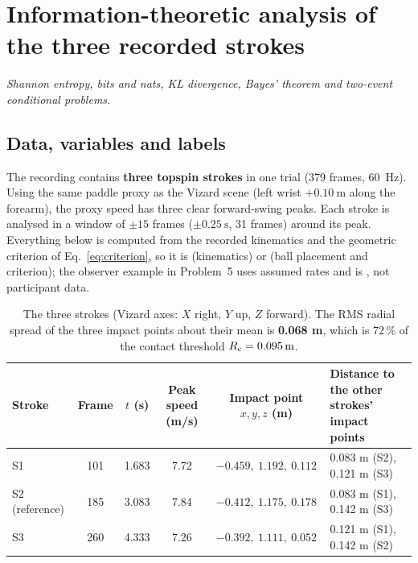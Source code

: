 \section{Information-theoretic analysis of the three recorded strokes}\label{app:info}

\emph{Shannon entropy, bits and nats, KL divergence, Bayes' theorem and two-event conditional problems.}

\subsection{Data, variables and labels}

The recording contains \textbf{three topspin strokes} in one trial (379 frames, \SI{60}{\hertz}). Using the same paddle proxy as the Vizard scene (left wrist $+\SI{0.10}{\meter}$ along the forearm), the proxy speed has three clear forward-swing peaks. Each stroke is analysed in a window of $\pm15$ frames ($\pm\SI{0.25}{\second}$, 31 frames) around its peak. Everything below is computed from the recorded kinematics and the geometric criterion of Eq.~\eqref{eq:criterion}, so it is \tagobs{} (kinematics) or \tagsim{} (ball placement and criterion); the observer example in Problem~5 uses assumed rates and is \tagill{}, not participant data.

\begin{table}[ht]
    \centering
    \caption{The three strokes (Vizard axes: $X$ right, $Y$ up, $Z$ forward). The RMS radial spread of the three impact points about their mean is \textbf{0.068 m}, which is $72\,\%$ of the contact threshold $\Rc=\SI{0.095}{\meter}$.}\label{tab:strokes}
    \footnotesize
    \begin{tabularx}{\textwidth}{@{}l c c c c Y@{}}
        \toprule
        \textbf{Stroke} & \textbf{Frame} & $t$ (s) & \textbf{Peak speed (m/s)} & \textbf{Impact point $x,y,z$ (m)} & \textbf{Distance to the other strokes' impact points} \\
        \midrule
        S1              & 101            & 1.683   & 7.72                      & $-0.459,\ 1.192,\ 0.112$          & 0.083 m (S2), 0.121 m (S3)                            \\
        S2 (reference)  & 185            & 3.083   & 7.84                      & $-0.412,\ 1.175,\ 0.178$          & 0.083 m (S1), 0.142 m (S3)                            \\
        S3              & 260            & 4.333   & 7.26                      & $-0.392,\ 1.111,\ 0.052$          & 0.121 m (S1), 0.142 m (S2)                            \\
        \bottomrule
    \end{tabularx}
\end{table}

